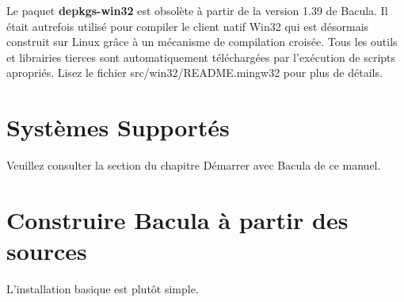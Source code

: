 Le paquet {\bf depkgs-win32} est obsolète à partir de la version 1.39 de Bacula. 
Il était autrefois utilisé pour compiler le client natif Win32 qui est 
désormais construit sur Linux grâce à un mécanisme de compilation croisée. 
Tous les outils et librairies tierces sont automatiquement téléchargées 
par l'exécution de scripts apropriés. Lisez le fichier src/win32/README.mingw32 
pour plus de détails.

\section{Syst\`emes Support\'es}
\label{Systems}

Veuillez consulter la section 
 du chapitre
D\'emarrer avec Bacula de ce manuel. 

\section{Construire Bacula \`a partir des sources}
\label{Building}

L'installation basique est plut\^ot simple. 

